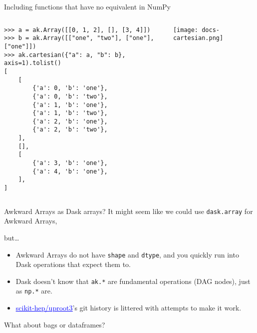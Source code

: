 \documentclass[aspectratio=169]{beamer}
\begin{document}
\begin{frame}[fragile]{Including functions that have no equivalent in NumPy}
\small
\vspace{-0.75 cm}
\begin{columns}
\begin{verbatim}
>>> a = ak.Array([[0, 1, 2], [], [3, 4]])
>>> b = ak.Array([["one", "two"], ["one"], ["one"]])
>>> ak.cartesian({"a": a, "b": b}, axis=1).tolist()
[
    [
        {'a': 0, 'b': 'one'},
        {'a': 0, 'b': 'two'},
        {'a': 1, 'b': 'one'},
        {'a': 1, 'b': 'two'},
        {'a': 2, 'b': 'one'},
        {'a': 2, 'b': 'two'},
    ],
    [],
    [
        {'a': 3, 'b': 'one'},
        {'a': 4, 'b': 'one'},
    ],
]
\end{verbatim}

\vspace{-5.5 cm}
\hfill\texttt{[image: docs-cartesian.png]}
\end{columns}
\end{frame}

\begin{frame}{Awkward Arrays as Dask arrays?}
\Large
It might seem like we could use \texttt{dask.array} for Awkward Arrays,

but\ldots

\large
\vspace{0.5 cm}
\begin{itemize}\setlength{\itemsep}{0.5 cm}
\item<2-> Awkward Arrays do not have \texttt{shape} and \texttt{dtype}, and you quickly run into Dask operations that expect them to.
\item<3-> Dask doesn't know that \texttt{ak.*} are fundamental operations (DAG nodes), just as \texttt{np.*} are.
\item<4-> \href{https://github.com/scikit-hep/uproot3}{\textcolor{blue}{\underline{scikit-hep/uproot3}}}'s git history is littered with attempts to make it work.
\end{itemize}
\end{frame}

\begin{frame}{What about bags or dataframes?}
\begin{columns}
\vspace{0.25 cm}



\end{columns}
\end{frame}
\end{document}
